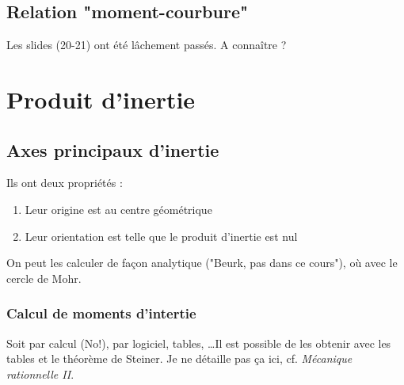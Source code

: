 	\subsection{Relation "moment-courbure"}
	Les slides (20-21) ont été lâchement passés. A connaître ? 
	
\section{Produit d'inertie}
	\subsection{Axes principaux d'inertie}
	Ils ont deux propriétés :
	\begin{enumerate}
	\item Leur origine est au centre géométrique
	\item Leur orientation est telle que le produit d’inertie est nul
	\end{enumerate}
	On peut les calculer de façon analytique ("Beurk, pas dans ce cours"), 
	où avec le cercle de Mohr.
	
	\subsubsection{Calcul de moments d'intertie}
	Soit par calcul (No!), par logiciel, tables, \dots Il est possible de les 
	obtenir avec les tables et le théorème de Steiner. Je ne détaille pas ça 
	ici, cf. \textit{Mécanique rationnelle II}.
	





